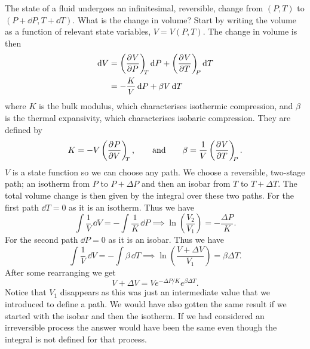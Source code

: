 \documentclass[a4paper]{article}
\begin{document}
    \begin{example}
        The state of a fluid undergoes an infinitesimal, reversible, change from \((P, T)\) to \((P + \dd{P}, T + \dd{T})\).
        What is the change in volume?
        Start by writing the volume as a function of relevant state variables, \(V = V(P, T)\).
        The change in volume is then
        \begin{align*}
            \dd{V} &= \left(\pdv[]{V}{P}\right)_{\!\!{T}}\dd{P} + \left(\pdv[]{V}{T}\right)_{\!\!{P}}\dd{T}\\
            &= -\frac{K}{V}\dd{P} + \beta V\dd{T}
        \end{align*}
        where \(K\) is the bulk modulus, which characterises isothermic compression, and \(\beta\) is the thermal expansivity, which characterises isobaric compression.
        They are defined by
        \[K = -V\left(\pdv[]{P}{V}\right)_{\!\!{T}},\qquad\text{and}\qquad\beta = \frac{1}{V}\left(\pdv[]{V}{T}\right)_{\!\!{P}}.\]
        \(V\) is a state function so we can choose any path.
        We choose a reversible, two-stage path; an isotherm from \(P\) to \(P + \Delta P\) and then an isobar from \(T\) to \(T + \Delta T\).
        The total volume change is then given by the integral over these two paths.
        For the first path \(\dd{T} = 0\) as it is an isotherm.
        Thus we have
        \[\int\frac{1}{V}\,\dd{V} = -\int\frac{1}{K}\,\dd{P} \implies \ln\left(\frac{V_2}{V_1}\right) = -\frac{\Delta P}{K}.\]
        For the second path \(\dd{P} = 0\) as it is an isobar.
        Thus we have
        \[\int\frac{1}{V}\,\dd{V} = -\int\beta\,\dd{T} \implies \ln\left(\frac{V + \Delta V}{V_1}\right) = \beta\Delta T.\]
        After some rearranging we get
        \[V + \Delta V = Ve^{-\Delta P/K}e^{\beta\Delta T}.\]
        Notice that \(V_1\) disappears as this was just an intermediate value that we introduced to define a path.
        We would have also gotten the same result if we started with the isobar and then the isotherm.
        If we had considered an irreversible process the answer would have been the same even though the integral is not defined for that process.
    \end{example}
    
\end{document}
